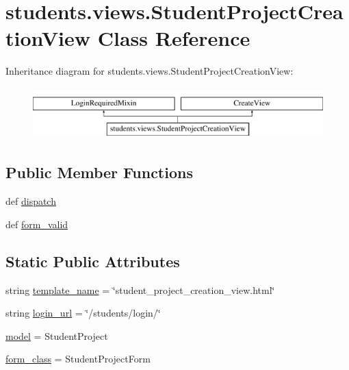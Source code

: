 \hypertarget{classstudents_1_1views_1_1_student_project_creation_view}{\section{students.\-views.\-Student\-Project\-Creation\-View Class Reference}
\label{classstudents_1_1views_1_1_student_project_creation_view}
}
Inheritance diagram for students.\-views.\-Student\-Project\-Creation\-View\-:\begin{figure}[H]
\begin{center}
\leavevmode
\includegraphics[height=2.000000cm]{classstudents_1_1views_1_1_student_project_creation_view}
\end{center}
\end{figure}
\subsection*{Public Member Functions}
\begin{DoxyCompactItemize}
\item 
def \hyperlink{classstudents_1_1views_1_1_student_project_creation_view_abab72acbf11b726e50eb44f97965430c}{dispatch}
\item 
def \hyperlink{classstudents_1_1views_1_1_student_project_creation_view_a3b2f139feec7b5eb7cc843c85355a4e5}{form\-\_\-valid}
\end{DoxyCompactItemize}
\subsection*{Static Public Attributes}
\begin{DoxyCompactItemize}
\item 
string \hyperlink{classstudents_1_1views_1_1_student_project_creation_view_a07eb488f8065c396ce7de30defb9cfc7}{template\-\_\-name} = \char`\"{}student\-\_\-project\-\_\-creation\-\_\-view.\-html\char`\"{}
\item 
string \hyperlink{classstudents_1_1views_1_1_student_project_creation_view_a4e70c0359cfb38688ba9af46c5e8349d}{login\-\_\-url} = \char`\"{}/students/login/\char`\"{}
\item 
\hyperlink{classstudents_1_1views_1_1_student_project_creation_view_ac30385a37dc52e2e578433f54645844b}{model} = Student\-Project
\item 
\hyperlink{classstudents_1_1views_1_1_student_project_creation_view_a8e507a48d680de20cb41f5d3e608b3e4}{form\-\_\-class} = Student\-Project\-Form
\end{DoxyCompactItemize}


